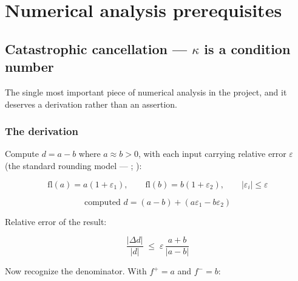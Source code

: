 %
\section{Numerical analysis prerequisites}
\label{part:numerics}

\subsection{Catastrophic cancellation --- \texorpdfstring{$\kappa$}{kappa} is a
  condition number}
\label{sec:cancellation}

The single most important piece of numerical analysis in the project, and it
deserves a derivation rather than an assertion.

\subsubsection{The derivation}
\label{sec:cancellationderivation}

Compute $d = a - b$ where $a \approx b > 0$, with each input carrying relative
error $\varepsilon$ (the standard rounding model ---
\citealt{goldberg1991}; \citealt{higham2002}):

\begin{equation*}
\mathrm{fl}(a) = a(1+\varepsilon_1), \qquad
\mathrm{fl}(b) = b(1+\varepsilon_2), \qquad
|\varepsilon_i| \leq \varepsilon
\end{equation*}

\begin{equation*}
\text{computed } d = (a-b) + (a\varepsilon_1 - b\varepsilon_2)
\end{equation*}

Relative error of the result:

\begin{equation}
\frac{|\Delta d|}{|d|} \;\leq\; \varepsilon\,\frac{a+b}{|a-b|}
\label{eq:cancellation-bound}
\end{equation}

Now recognize the denominator. With $f^+ = a$ and $f^- = b$:

